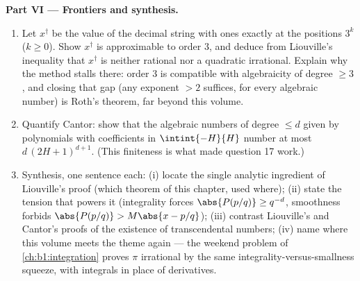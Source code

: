 \begin{problem}
\medskip
\noindent\textbf{Part VI --- Frontiers and synthesis.}
\begin{enumerate}[resume]
  \item Let $x^\dagger$ be the value of the decimal string with
        ones exactly at the positions $3^k$ ($k \geq 0$). Show
        $x^\dagger$ is approximable to order $3$, and deduce
        from Liouville's inequality that $x^\dagger$ is neither
        rational nor a quadratic irrational. Explain why the
        method stalls there: order $3$ is compatible with
        algebraicity of degree $\geq 3$, and closing that gap
        (any exponent $> 2$ suffices, for every algebraic
        number) is Roth's theorem, far beyond this volume.
  \item Quantify Cantor: show that the algebraic numbers of
        degree $\leq d$ given by polynomials with coefficients
        in $\intint{-H}{H}$ number at most $d\,(2H + 1)^{d+1}$.
        (This finiteness is what made question 17 work.)
  \item Synthesis, one sentence each: (i) locate the single
        analytic ingredient of Liouville's proof (which theorem
        of this chapter, used where); (ii) state the tension
        that powers it (integrality forces $\abs{P(p/q)} \geq
        q^{-d}$, smoothness forbids $\abs{P(p/q)} > M\abs{x -
        p/q}$); (iii) contrast Liouville's and Cantor's proofs
        of the existence of transcendental numbers; (iv) name
        where this volume meets the theme again --- the weekend
        problem of \cref{ch:b1:integration} proves $\pi$
        irrational by the same integrality-versus-smallness
        squeeze, with integrals in place of derivatives.
\end{enumerate}
\end{problem}
